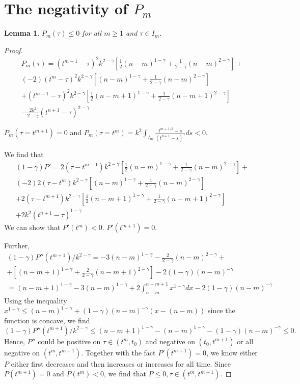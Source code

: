 \documentclass[11pt]{article} %
\newtheorem{lmm}{Lemma}
\begin{document}
\section{The negativity of $P_m$}
\begin{lmm}
$P_m(\tau)\le 0$ for all $m\ge 1$ and $\tau\in I_m$.
\end{lmm}
\begin{proof}
\begin{multline*}
P_m(\tau)=(t^{m-1}-\tau)^2k^{2-\gamma}[\frac{1}{2}(n-m)^{1-\gamma}+\frac{1}{2-\gamma}(n-m)^{2-\gamma}]+\\
(-2)(t^m-\tau)^2k^{2-\gamma}[(n-m)^{1-\gamma}+\frac{1}{2-\gamma}(n-m)^{2-\gamma}]\\
+(t^{m+1}-\tau)^2k^{2-\gamma}[\frac{1}{2}(n-m+1)^{1-\gamma}+\frac{1}{2-\gamma}(n-m+1)^{2-\gamma}]\\
-\frac{2k^2}{2-\gamma}(t^{n+1}-\tau)^{2-\gamma}
\end{multline*}

$P_m(\tau=t^{m+1})=0$ and
$P_m(\tau=t^m)=k^2\int_{I_m}\frac{t^{m+1/2}-s}{(t^{n+1}-s)^{\gamma}}ds<0$.

We find that 
\begin{multline*}
(1-\gamma)P'=2(\tau-t^{m-1})k^{2-\gamma}[\frac{1}{2}(n-m)^{1-\gamma}+\frac{1}{2-\gamma}(n-m)^{2-\gamma}]+\\
(-2)2(\tau-t^m)k^{2-\gamma}[(n-m)^{1-\gamma}+\frac{1}{2-\gamma}(n-m)^{2-\gamma}]\\
+2(\tau-t^{m+1})k^{2-\gamma}[\frac{1}{2}(n-m+1)^{1-\gamma}+\frac{1}{2-\gamma}(n-m+1)^{2-\gamma}]\\
+2k^2(t^{n+1}-\tau)^{1-\gamma}
\end{multline*}
We can show that $P'(t^m)<0$. $P'(t^{m+1})=0$. 

Further, 
\begin{multline*}
(1-\gamma)P''(t^{m+1})/k^{2-\gamma}=
-3(n-m)^{1-\gamma}-\frac{2}{2-\gamma}(n-m)^{2-\gamma}+\\
+[(n-m+1)^{1-\gamma}+\frac{2}{2-\gamma}(n-m+1)^{2-\gamma}]
-2(1-\gamma)(n-m)^{-\gamma}\\
=(n-m+1)^{1-\gamma}-3(n-m)^{1-\gamma}
+2\int_{n-m}^{n-m+1}x^{1-\gamma}dx-2(1-\gamma)(n-m)^{-\gamma}
\end{multline*}
Using the inequality $x^{1-\gamma}\le (n-m)^{1-\gamma}+(1-\gamma)(n-m)^{-\gamma}(x-(n-m))$ since the function is concave, we find $$
(1-\gamma)P''(t^{m+1})/k^{2-\gamma}\le (n-m+1)^{1-\gamma}-(n-m)^{1-\gamma}
-(1-\gamma)(n-m)^{-\gamma}\le 0.
$$
Hence, $P''$ could be positive on $\tau\in (t^m, t_0)$ and negative on $(t_0, t^{m+1})$ or all negative on $(t^m, t^{m+1})$. Together with the fact $P'(t^{m+1})=0$, we know either $P$ either first decreases and then increases or increases for all time. Since $P(t^{m+1})=0$ and $P(t^m)<0$, we find that $P\le 0,\tau\in (t^m, t^{m+1})$.
\end{proof}
\end{document}
